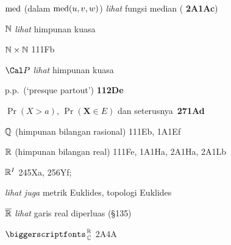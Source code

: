$\mathop{\text{med}}\nolimits$ (dalam $\mathop{\text{med}}\nolimits(u,v,w)$) {\it lihat} fungsi median ({\bf
2A1Ac})




\indexmedskip
{}

$\Bbb N$
{\it lihat} himpunan kuasa


$\Bbb N\times\Bbb N$ 111Fb























\indexmedskip
{}

$\Cal P$ {\it lihat} himpunan kuasa



























p.p.\ (`presque partout') {\bf 112De}

$\Pr(X>a)$, $\Pr(\pmb{X}\in E)$ dan seterusnya\ {\bf 271Ad}


\indexmedskip
{}

$\Bbb Q$ (himpunan bilangan rasional) 111Eb, 1A1Ef





\indexmedskip
{}

$\Bbb R$ (himpunan bilangan real) 111Fe, 1A1Ha,
  2A1Ha, 2A1Lb


$\Bbb R^I$ 245Xa, 256Yf;  
  
  {\it lihat juga} metrik Euklides, topologi Euklides




$\overline{\Bbb R}$ {\it lihat} garis real diperluas (\S135)



$\RoverC$ 2A4A


















